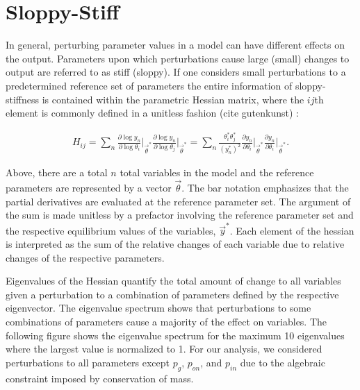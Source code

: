 \documentclass[preprint,authoryear,12pt]{elsarticle}
\begin{document}
\section{Sloppy-Stiff}
In general, perturbing parameter values in a model can have different effects on the output. Parameters upon which perturbations cause large (small) changes to output are referred to as stiff (sloppy). If one considers small perturbations to a predetermined reference set of parameters the entire information of sloppy-stiffness is contained within the parametric Hessian matrix, where the $ij$th element is commonly defined in a unitless fashion (cite gutenkunst) :

\begin{eqnarray}
H_{ij} = \sum_{n} \frac{\partial{\log{y_n}}}{\partial{\log{\theta_i }}}\bigg|_{\vec \theta^*} \frac{\partial{\log{y_n}}}{\partial{\log{\theta_j}}}\bigg|_{\vec \theta^*} = \sum_{n} \frac{\theta^*_i \theta^*_j}{(y^*_n)^2} \frac{\partial y_n}{\partial{\theta_i}}\bigg|_{\vec \theta^*} \frac{\partial y_n}{\partial{\theta_i}}\bigg|_{\vec \theta^*}.
\end{eqnarray}

Above, there are a total $n$ total variables in the model and the reference parameters are represented by a vector $\vec \theta$. The bar notation emphasizes that the partial derivatives are evaluated at the reference parameter set. The argument of the sum is made unitless by a prefactor involving the reference parameter set and the respective equilibrium values of the variables, $\vec y^*$. Each element of the hessian is interpreted as the sum of the relative changes of each variable due to relative changes of the respective parameters.

Eigenvalues of the Hessian quantify the total amount of change to all variables given a perturbation to a combination of parameters defined by the respective eigenvector. The eigenvalue spectrum shows that perturbations to some combinations of parameters cause a majority of the effect on variables. The following figure shows the eigenvalue spectrum for the maximum 10 eigenvalues where the largest value is normalized to 1. For our analysis, we considered perturbations to all parameters except $p_g$, $p_{on}$, and $p_{in}$ due to the algebraic constraint imposed by conservation of mass.
\end{document}
